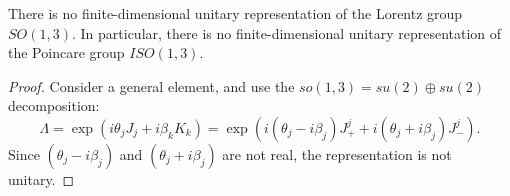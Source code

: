 \begin{fact}
    \label{fact:infinite-dim}
    There is no finite-dimensional unitary representation of the Lorentz group $SO(1,3)$. In particular, there is no finite-dimensional unitary representation of the Poincare group $ISO(1,3)$.
\end{fact}
\begin{proof}
    Consider a general element, and use the $so(1,3) = su(2) \oplus su(2)$ decomposition:
    \[
    \Lambda = \exp(i \theta_j J_j + i \beta_k K_k) = \exp(i (\theta_j - i \beta_j) J_+^j + i (\theta_j + i \beta_j) J_-^j).
    \]
    Since $(\theta_j - i \beta_j)$ and $(\theta_j + i \beta_j)$ are not real, the representation is not unitary.
\end{proof}